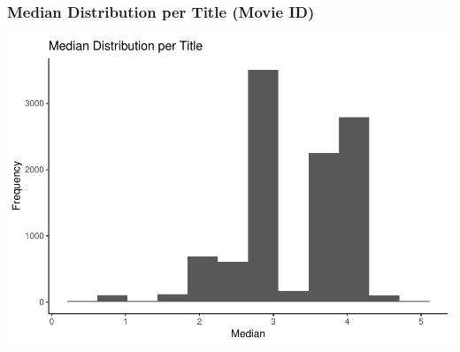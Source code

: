 \documentclass[]{article}
\begin{document}
\hypertarget{median-distribution-per-title-movie-id}{%
\subsubsection{Median Distribution per Title (Movie
ID)}\label{median-distribution-per-title-movie-id}}

\begin{center}\includegraphics{MovieLens_Project_Report_files/figure-latex/unnamed-chunk-24-1} \end{center}
\end{document}
